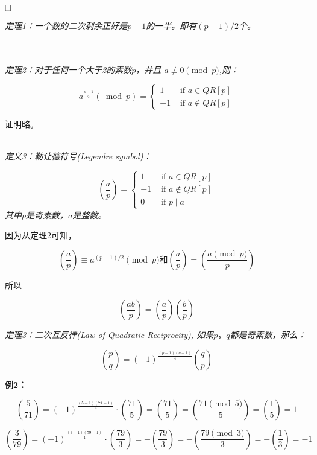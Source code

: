 \documentclass{article}
\begin{document}
$\hfill\square$ 

\textit{定理1：一个数的二次剩余正好是$p-1$的一半。即有$(p-1)/2$个。}

~\\


\href{https://www.maths.tcd.ie/pub/Maths/Courseware/NumberTheory/QuadraticResidues.pdf}{\color{blue}{证明57页}}
~\\


\textit{定理2：对于任何一个大于2的素数$p$，并且 $a \not\equiv 0 \pmod{p}$,则：}

$$
a^{\frac{p-1}{2}}(\bmod p)=\left\{\begin{array}{ll}
1 & \text { if } a \in Q R[p] \\
-1 & \text { if } a \notin Q R[p]
\end{array}\right.
$$

证明略。

~\\

\textit{定义3：勒让德符号(Legendre symbol)：}

$$
\left(\frac{a}{p}\right)=\left\{\begin{array}{ll}
1 & \text { if } a \in Q R[p] \\
-1 & \text { if } a \notin Q R[p] \\
0 & \text { if } p \mid a
\end{array}\right.
$$
\textit{其中$p$是奇素数，$a$是整数。}

因为从定理2可知，

$$
\left(\frac{a}{p}\right) \equiv a^{(p-1) / 2}\pmod{p} \mbox{和} \left(\frac{a}{p}\right)=\left(\frac{a \pmod{p} }{p}\right)
$$

所以

$$\left( \frac{ab}{p} \right) = \left( \frac{a}{p} \right)\left( \frac{b}{p} \right)$$



\textit{定理3：二次互反律(Law of Quadratic Reciprocity), 如果$p，q$都是奇素数，那么：}

$$
\left(\frac{p}{q}\right)=(-1)^{\frac{(p-1)(q-1)}{4}}\left(\frac{q}{p}\right)
$$

\textbf{例2：}

$$
\left(\frac{5}{71}\right)=(-1)^{\frac{(5-1)(71-1)}{4}} \cdot \left(\frac{71}{5}\right)=\left(\frac{71}{5}\right)=\left(\frac{71 \pmod{5}}{5}\right)=\left(\frac{1}{5}\right) = 1
$$

$$
\left(\frac{3}{79}\right)=(-1)^{\frac{(3-1)(79-1)}{4}} \cdot \left(\frac{79}{3}\right)=-\left(\frac{79}{3}\right)=-\left(\frac{79 \pmod{3}}{3}\right)=-\left(\frac{1}{3}\right) = -1
$$
\end{document}
